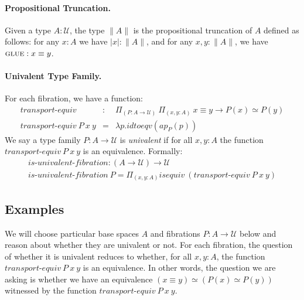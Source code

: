 \documentclass{entcs}
\newcommand{\gluep}{\textsc{glue}}
\begin{document}
\paragraph*{Propositional Truncation.} Given a type $A : \mathcal{U}$, the type
$\|A\|$ is the propositional truncation of $A$ defined as follows: for
  any $x:A$ we have $|x| : \|A\|$, and for any $x,y : \|A\|$, we have
  $\gluep : x \equiv y$.

\paragraph*{Univalent Type Family.}
For each fibration, we have a function:
\[\begin{array}{rcl}
\textit {transport-equiv} &:& \Pi_{(P : A \to \mathcal{U})}~ \Pi_{(x,y:A)}~
    x \equiv y  \to P(x) \simeq P(y) \\
\textit{transport-equiv}~P~x~y &=& \lambda p. \mathit{idtoeqv}(\mathit{ap}_{P}(p))
\end{array}\]
We say a type family $P : A \to \mathcal{U}$ is \emph{univalent} if for all
$x,y:A$ the function $\textit{transport-equiv}~P~x~y$ is an
equivalence. Formally:
\[\begin{array}{l}
\textit{is-univalent-fibration} : (A \to \mathcal{U}) \to \mathcal{U} \\
\textit{is-univalent-fibration}~P = \Pi_{(x,y:A)} \textit{isequiv}~(\textit{transport-equiv}~P~x~y)
\end{array}\]

\subsection{Examples}

We will choose particular base spaces $A$ and fibrations $P : A \to \mathcal{U}$
below and reason about whether they are univalent or not. For each fibration,
the question of whether it is univalent reduces to whether, for all $x,y:A$, the
function $\textit{transport-equiv}~P~x~y$ is an equivalence. In other words, the
question we are asking is whether we have an equivalence
$(x \equiv y) \simeq (P(x) \simeq P(y))$ witnessed by the function
$\textit{transport-equiv}~P~x~y$.
\end{document}
